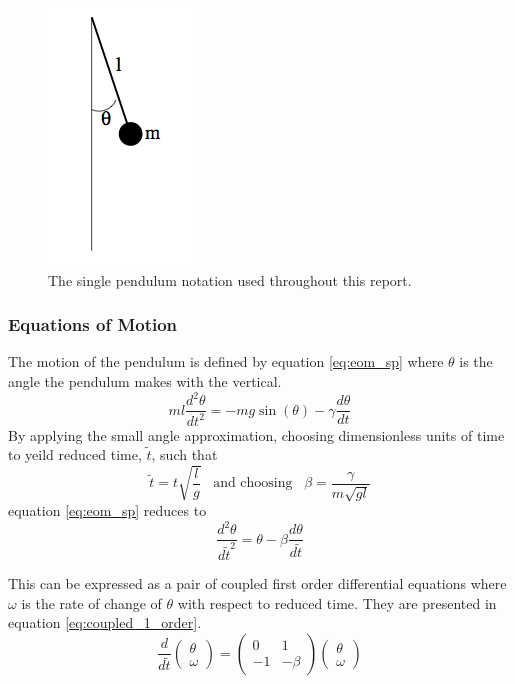 \documentclass[11pt]{article}
\begin{document}
\begin{figure}
\vspace{-20pt}
\hspace{5pt}
\includegraphics[height=0.3\textheight]{img/sp_diag.png}
\caption{The single pendulum notation used throughout this report.}
\label{fig:sp_diag}
\end{figure}

\subsubsection*{Equations of Motion}
The motion of the pendulum is defined by equation \ref{eq:eom_sp} where $\theta$ is the angle the pendulum makes with the vertical.
\begin{equation} \label{eq:eom_sp}
ml\frac{d^2 \theta}{dt^2} = -mg\sin(\theta) - \gamma\frac{d\theta}{dt}
\end{equation}
By applying the small angle approximation, choosing dimensionless units of time to yeild reduced time, $\widetilde{t}$, such that
\begin{equation} \label{eq:const_def}
\widetilde{t} = t\sqrt{\frac{l}{g}} \;\;\; \text{and choosing} \;\;\; \beta = \frac{\gamma}{m \sqrt{gl}}
\end{equation}
equation \ref{eq:eom_sp} reduces to
\begin{equation} \label{eq:eomsp_reduced}
\frac{d^2 \theta}{d\widetilde{t}^2} = \theta - \beta\frac{d\theta}{d\widetilde{t}}
\end{equation}

This can be expressed as a pair of coupled first order differential equations where $\omega$ is the rate of change of $\theta$ with respect to reduced time. They are presented in equation \ref{eq:coupled_1_order}.
\begin{equation} \label{eq:coupled_1_order}
\frac{d}{d\widetilde{t}} \begin{pmatrix}\theta \\ \omega \end{pmatrix} = \begin{pmatrix} 0 & 1 \\ -1 & -\beta \end{pmatrix} \begin{pmatrix}\theta \\ \omega \end{pmatrix}
\end{equation}
\end{document}
